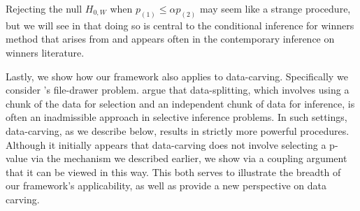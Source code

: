 \documentclass{article}
\begin{document}
Rejecting the null $H_{0, W}$ when $p_{(1)} \leq \alpha p_{(2)}$ may seem like a strange procedure, but we will see in  that doing so is central to the conditional inference for winners method that arises from \cite{Fithian2017} and appears often in the contemporary inference on winners literature.

Lastly, we show how our framework also applies to data-carving. Specifically we consider \cite{Fithian2017}'s file-drawer problem.  \cite{Fithian2017} argue that data-splitting, which involves using a chunk of the data for selection and an independent chunk of data for inference, is often an inadmissible approach in selective inference problems. In such settings, data-carving, as we describe below, results in strictly more powerful procedures. Although it initially appears that data-carving does not involve selecting a p-value via the mechanism we described earlier, we show via a coupling argument that it can be viewed in this way. This both serves to illustrate the breadth of our framework's applicability, as well as provide a new perspective on data carving. 
\end{document}
